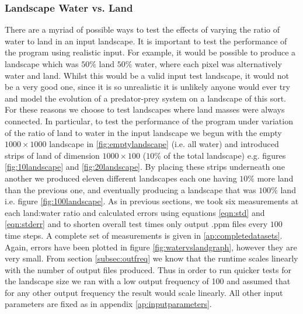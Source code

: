 \subsubsection{Landscape Water vs. Land}
\label{subsub:watervsland}
There are a myriad of possible ways to test the effects of varying the ratio of water to land in an input landscape. It is important to test the performance of the program using realistic input. For example, it would be possible to produce a landscape which was $50\%$ land $50\%$ water, where each pixel was alternatively water and land. Whilst this would be a valid input test landscape, it would not be a very good one, since it is so unrealistic it is unlikely anyone would ever try and model the evolution of a predator-prey system on a landscape of this sort. For these reasons we choose to test landscapes where land masses were always connected. In particular, to test the performance of the program under variation of the ratio of land to water in the input landscape we begun with the empty $1000 \times 1000$ landscape in \ref{fig:emptylandscape} (i.e. all water) and introduced strips of land of dimension $1000 \times 100$ ($10\%$ of the total landscape) e.g. figures \ref{fig:10landscape} and \ref{fig:20landscape}. By placing these strips underneath one another we produced eleven different landscapes each one having $10\%$ more land than the previous one, and eventually producing a landscape that was $100\%$ land i.e. figure \ref{fig:100landscape}. As in previous sections, we took six measurements at each land:water ratio and calculated errors using equations \ref{eqn:std} and \ref{eqn:stderr} and to shorten overall test times only output .ppm files every $100$ time steps. A complete set of measurements is given in \ref{ap:completedatasets}. Again, errors have been plotted in figure \ref{fig:watervslandgraph}, however they are very small. From section \ref{subsec:outfreq} we know that the runtime scales linearly with the number of output files produced. Thus in order to run quicker tests for the landscape size we ran with a low output frequency of 100 and assumed that for any other output frequency the result would scale linearly. All other input parameters are fixed as in appendix \ref{ap:inputparameters}.

